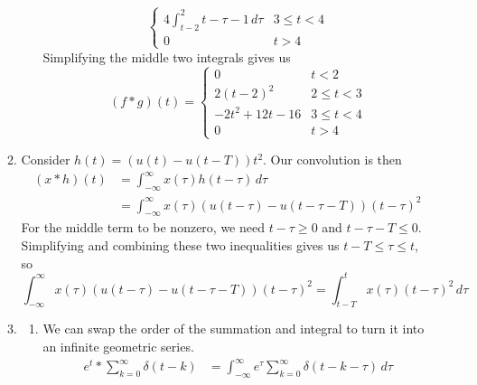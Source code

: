 \documentclass[12pt]{article}
\begin{document}
\begin{enumerate}
\begin{enumerate}
\begin{enumerate}
\[\begin{cases}
                                                4\int_{t-2}^{2} t-\tau-1\,d\tau & 3 \le t < 4 \\
                                                0                               & t > 4
                                          \end{cases}\]
                                    Simplifying the middle two integrals gives us
                                    \[(f * g)(t)=\begin{cases}
                                                0            & t < 2       \\
                                                2(t-2)^2      & 2 \le t < 3 \\
                                                -2t^2+12t-16 & 3 \le t < 4 \\
                                                0            & t > 4
                                          \end{cases}\]
                        \end{enumerate}
                  \item Consider $h(t)=(u(t)-u(t-T))t^2$.
                        Our convolution is then
                        \begin{align*}
                              (x * h)(t)
                               & = \int_{-\infty}^{\infty} x(\tau)h(t-\tau)\,d\tau                  \\
                               & = \int_{-\infty}^{\infty} x(\tau)(u(t-\tau)-u(t-\tau-T))(t-\tau)^2
                        \end{align*}
                        For the middle term to be nonzero, we need $t-\tau \ge 0$ and $t-\tau-T \le 0$.
                        Simplifying and combining these two inequalities gives us $t-T \le \tau \le t$, so
                        \[\int_{-\infty}^{\infty} x(\tau)(u(t-\tau)-u(t-\tau-T))(t-\tau)^2
                              =\int_{t-T}^{t} x(\tau)(t-\tau)^2\,d\tau\]
                  \item \begin{enumerate}
                              \item We can swap the order of the summation
                                    and integral to turn it into an infinite geometric series.
                                    \begin{align*}
                                          e^t * \sum_{k=0}^{\infty} \delta(t-k)
                                           & = \int_{-\infty}^{\infty} e^\tau \sum_{k=0}^{\infty} \delta(t-k-\tau)\,d\tau \\

\end{align*}
\end{enumerate}
\end{enumerate}
\end{enumerate}
\end{document}
